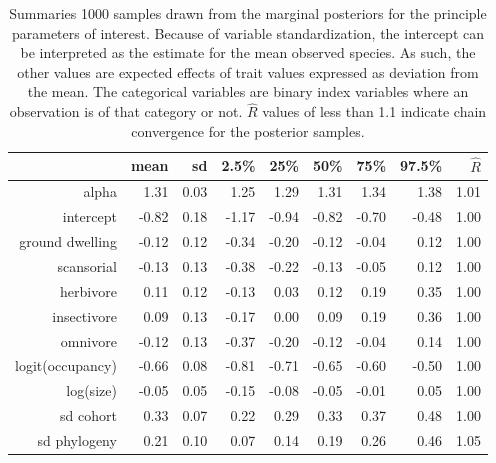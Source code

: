 \begin{table}[ht]
  \centering
  \caption{Summaries 1000 samples drawn from the marginal posteriors for the principle parameters of interest. Because of variable standardization, the intercept can be interpreted as the estimate for the mean observed species. As such, the other values are expected effects of trait values expressed as deviation from the mean. The categorical variables are binary index variables where an observation is of that category or not. \(\hat{R}\) values of less than 1.1 indicate chain convergence for the posterior samples.}
  \begin{tabular}{rrrrrrrrr}
    \hline
    & mean & sd & 2.5\% & 25\% & 50\% & 75\% & 97.5\% & \(\hat{R}\) \\ 
    \hline
    \hline
    alpha & 1.31 & 0.03 & 1.25 & 1.29 & 1.31 & 1.34 & 1.38 & 1.01 \\ 
    \hline
    intercept & -0.82 & 0.18 & -1.17 & -0.94 & -0.82 & -0.70 & -0.48 & 1.00 \\ 
    ground dwelling & -0.12 & 0.12 & -0.34 & -0.20 & -0.12 & -0.04 & 0.12 & 1.00 \\ 
    scansorial & -0.13 & 0.13 & -0.38 & -0.22 & -0.13 & -0.05 & 0.12 & 1.00 \\ 
    herbivore & 0.11 & 0.12 & -0.13 & 0.03 & 0.12 & 0.19 & 0.35 & 1.00 \\ 
    insectivore & 0.09 & 0.13 & -0.17 & 0.00 & 0.09 & 0.19 & 0.36 & 1.00 \\ 
    omnivore & -0.12 & 0.13 & -0.37 & -0.20 & -0.12 & -0.04 & 0.14 & 1.00 \\ 
    logit(occupancy) & -0.66 & 0.08 & -0.81 & -0.71 & -0.65 & -0.60 & -0.50 & 1.00 \\ 
    log(size) & -0.05 & 0.05 & -0.15 & -0.08 & -0.05 & -0.01 & 0.05 & 1.00 \\ 
    \hline
    sd cohort & 0.33 & 0.07 & 0.22 & 0.29 & 0.33 & 0.37 & 0.48 & 1.00 \\ 
    sd phylogeny & 0.21 & 0.10 & 0.07 & 0.14 & 0.19 & 0.26 & 0.46 & 1.05 \\ 
    \hline
  \end{tabular}
  \label{post_sum}
\end{table}
